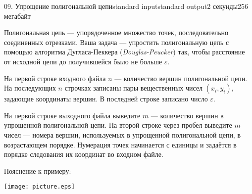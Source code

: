 \begin{problem}{09. Упрощение полигональной цепи}{standard input}{standard output}{2 секунды}{256 мегабайт}

Полигональная цепь — упорядоченное множество точек, последовательно соединенных отрезками.
Ваша задача — упростить полигональную цепь с помощью алгоритма Дугласа-Пеккера (\emph{Douglas-Peucker}) так,
чтобы расстояние от исходной цепи до получившейся было не больше $\varepsilon$.


\InputFile

На первой строке входного файла $n$ — количество вершин полигональной цепи.
На последующих $n$ строчках записаны пары вещественных чисел $(x_i, y_i)$, задающие координаты вершин.
В последней строке записано число $\varepsilon$.

\OutputFile

На первой строке выходного файла выведите $m$ — количество вершин в упрощенной полигональной цепи.
На второй строке через пробел выведите $m$ чисел — номера вершин, используемых в упрощенной полигональной цепи, в возрастающем порядке.
Нумерация точек начинается с единицы и задаётся в порядке следования их координат во входном файле.

\Examples

\begin{example}%
%
\end{example}
\Note
Пояснение к примеру:
	\begin{center}
		\texttt{[image: picture.eps]}
	\end{center}
\end{problem}